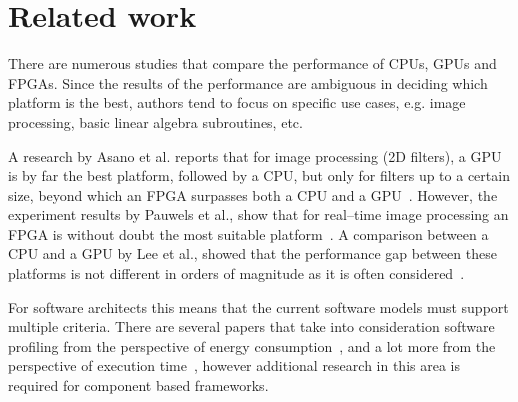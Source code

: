 \documentclass{sig-alternate}
\begin{document}
\begin{table}[h!]
	\centering
		\caption{Detection component execution times}
	\label{tab:detectionExec}
\end{table}

\clearpage

\section{Related work}

There are numerous studies that compare the performance of CPUs, GPUs and FPGAs. Since the results of the performance are ambiguous in deciding which platform is the best, authors tend to focus on specific use cases, e.g. image processing, basic linear algebra subroutines, etc. 

A research by Asano et al. reports that for image processing (2D filters), a GPU is by far the best platform, followed by a CPU, but only for filters up to a certain size, beyond which an FPGA surpasses both a CPU and a GPU~\cite{Asano2009}. However, the experiment results by Pauwels et al., show that for real--time image processing an FPGA is without doubt the most suitable platform~\cite{Ros2012}. A comparison between a CPU and a GPU by Lee et al., showed that the performance gap between these platforms is not different in orders of magnitude as it is often considered~\cite{Lee2010}.

For software architects this means that the current software models must support multiple criteria. There are several papers that take into consideration software profiling from the perspective of energy consumption~\cite{Seo2007}, and a lot more from the perspective of execution time~\cite{Tsoi2011,Lee2006}, however additional research in this area is required for component based frameworks. 
\end{document}
